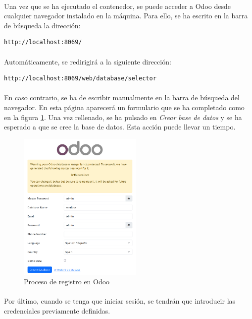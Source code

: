 \paragraph{}
Una vez que se ha ejecutado el contenedor, se puede acceder a Odoo desde cualquier navegador instalado en la máquina. Para ello, se ha escrito en la barra de búsqueda la dirección:

\begin{lstlisting}[frame=single, basicstyle=\small]
http://localhost:8069/
\end{lstlisting}

\paragraph{}
Automáticamente, se redirigirá a la siguiente dirección:


\begin{lstlisting}[frame=single, basicstyle=\small]
http://localhost:8069/web/database/selector
\end{lstlisting}
\paragraph{}
En caso contrario, se ha de escribir manualmente en la barra de búsqueda del navegador. En esta página aparecerá un formulario que se ha completado como en la figura \ref{fig:signup}. Una vez rellenado, se ha pulsado en \textit{Crear base de datos} y se ha esperado a que se cree la base de datos. Esta acción puede llevar un tiempo.

\begin{figure}[h]
    \centering
    \includegraphics[width=6cm]{instalacion/signup.png}
    \caption{Proceso de registro en Odoo}
    \label{fig:signup}
\end{figure}
\paragraph{}
Por último, cuando se tenga que iniciar sesión, se tendrán que introducir las credenciales previamente definidas.


